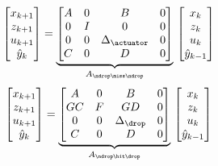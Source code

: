 \begin{equation}
    \begin{bmatrix}
        x_{k+1} \\
        z_{k+1} \\
        u_{k+1} \\
        \hat y_{k} \\
    \end{bmatrix} = \underbrace{\begin{bmatrix}
        A & 0 & B & 0 \\
        0 & I & 0 & 0 \\
        0 & 0 & \Delta_\actuator & 0 \\
        C & 0 & D & 0
    \end{bmatrix}}_{A_{\ndrop\miss\ndrop}}\, \begin{bmatrix}
        x_{k} \\
        z_{k} \\
        u_{k} \\
        \hat y_{k-1} \\
    \end{bmatrix}
\end{equation}
%
\begin{equation}
    \begin{bmatrix}
        x_{k+1} \\
        z_{k+1} \\
        u_{k+1} \\
        \hat y_{k} \\
    \end{bmatrix} = \underbrace{\begin{bmatrix}
        A & 0 & B & 0 \\
        GC & F & GD & 0 \\
        0 & 0 & \Delta_\drop & 0 \\
        C & 0 & D & 0
    \end{bmatrix}}_{A_{\ndrop\hit\drop}}\, \begin{bmatrix}
        x_{k} \\
        z_{k} \\
        u_{k} \\
        \hat y_{k-1} \\
    \end{bmatrix}
\end{equation}
%
